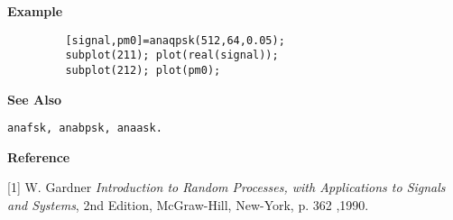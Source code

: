 {\bf \large {}\selectfont Example}
\begin{verbatim}
         [signal,pm0]=anaqpsk(512,64,0.05); 
         subplot(211); plot(real(signal)); 
         subplot(212); plot(pm0);
\end{verbatim}
\vspace*{.5cm}


{\bf \large {}\selectfont See Also}\\
\hspace*{1.5cm}
\begin{minipage}[t]{13.5cm}
\begin{verbatim}
anafsk, anabpsk, anaask.
\end{verbatim}
\end{minipage}
 \vspace*{.5cm}


{\bf \large {}\selectfont Reference}\\
\hspace*{1.5cm}
\begin{minipage}[t]{13.5cm}
[1] W. Gardner {\it Introduction to Random Processes, with Applications to
Signals and Systems}, 2nd Edition, McGraw-Hill, New-York, p. 362 ,1990.  
\end{minipage}

